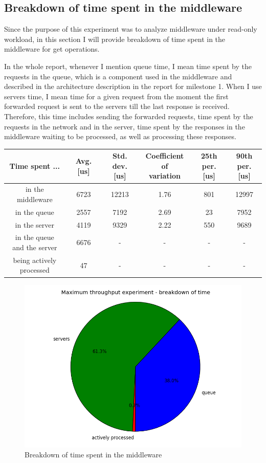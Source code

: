 \documentclass[11pt]{article}
\begin{document}
\subsection{Breakdown of time spent in the middleware}
\label{sec:time-breakdown}

Since the purpose of this experiment was to analyze middleware under read-only workload, in this section I will provide breakdown of time spent in the middleware for get operations.
\medskip

In the whole report, whenever I mention queue time, I mean time spent by the requests in the queue, which is a component used in the middleware and described in the architecture description in the report for milestone 1. When I use servers time, I mean time for a given request from the moment the first forwarded request is sent to the servers till the last response is received. Therefore, this time includes sending the forwarded requests, time spent by the requests in the network and in the server, time spent by the responses in the middleware waiting to be processed, as well as processing these responses.
\medskip

\begin{tabular}{|c|c|c|c|c|c|}
\hline \bf{Time spent ...} & \bf{Avg. [us]} & \parbox[t]{2.0cm}{\bf{Std.\\dev. [us]}} & \parbox[t]{2.5cm}{\bf{Coefficient of \\variation}} & \parbox[t]{1.7cm}{\bf{25th \\per. [us]}} & \parbox[t]{1.7cm}{\bf{90th \\per. [us]}} \\[3ex]
\hline in the middleware & 6723 & 12213 & 1.76 & 801 & 12997 \\
\hline in the queue & 2557 & 7192 & 2.69 & 23 & 7952\\
\hline in the server & 4119 & 9329 & 2.22 & 550 & 9689\\
\hline \parbox[t]{3cm}{in the queue\\and the server} & 6676 & - & - & -&-\\[3ex]
\hline \parbox[t]{3cm}{being actively\\processed} & 47 & - & - & -&-\\
\hline
\end{tabular}
\medskip

\begin{figure}
\centering
\includegraphics[width=0.5\linewidth]{plots/max_throughput-breakdown}
\caption{Breakdown of time spent in the middleware}
\label{fig:max-throughput-breakdown}
\end{figure}
\end{document}

